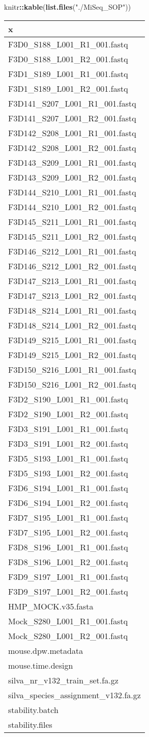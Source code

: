 \documentclass[]{elsarticle} %
\newenvironment{Shaded}{\begin{snugshade}}{\end{snugshade}}
\newcommand{\KeywordTok}[1]{\textcolor[rgb]{0.13,0.29,0.53}{\textbf{#1}}}
\newcommand{\StringTok}[1]{\textcolor[rgb]{0.31,0.60,0.02}{#1}}
\newcommand{\OperatorTok}[1]{\textcolor[rgb]{0.81,0.36,0.00}{\textbf{#1}}}
\newcommand{\NormalTok}[1]{#1}
\begin{document}
\begin{Shaded}
\begin{Highlighting}[]
\NormalTok{knitr}\OperatorTok{::}\KeywordTok{kable}\NormalTok{(}\KeywordTok{list.files}\NormalTok{(}\StringTok{"./MiSeq_SOP"}\NormalTok{))}
\end{Highlighting}
\end{Shaded}

\begin{longtable}[]{@{}l@{}}
\toprule
x\tabularnewline
\midrule
\endhead
F3D0\_S188\_L001\_R1\_001.fastq\tabularnewline
F3D0\_S188\_L001\_R2\_001.fastq\tabularnewline
F3D1\_S189\_L001\_R1\_001.fastq\tabularnewline
F3D1\_S189\_L001\_R2\_001.fastq\tabularnewline
F3D141\_S207\_L001\_R1\_001.fastq\tabularnewline
F3D141\_S207\_L001\_R2\_001.fastq\tabularnewline
F3D142\_S208\_L001\_R1\_001.fastq\tabularnewline
F3D142\_S208\_L001\_R2\_001.fastq\tabularnewline
F3D143\_S209\_L001\_R1\_001.fastq\tabularnewline
F3D143\_S209\_L001\_R2\_001.fastq\tabularnewline
F3D144\_S210\_L001\_R1\_001.fastq\tabularnewline
F3D144\_S210\_L001\_R2\_001.fastq\tabularnewline
F3D145\_S211\_L001\_R1\_001.fastq\tabularnewline
F3D145\_S211\_L001\_R2\_001.fastq\tabularnewline
F3D146\_S212\_L001\_R1\_001.fastq\tabularnewline
F3D146\_S212\_L001\_R2\_001.fastq\tabularnewline
F3D147\_S213\_L001\_R1\_001.fastq\tabularnewline
F3D147\_S213\_L001\_R2\_001.fastq\tabularnewline
F3D148\_S214\_L001\_R1\_001.fastq\tabularnewline
F3D148\_S214\_L001\_R2\_001.fastq\tabularnewline
F3D149\_S215\_L001\_R1\_001.fastq\tabularnewline
F3D149\_S215\_L001\_R2\_001.fastq\tabularnewline
F3D150\_S216\_L001\_R1\_001.fastq\tabularnewline
F3D150\_S216\_L001\_R2\_001.fastq\tabularnewline
F3D2\_S190\_L001\_R1\_001.fastq\tabularnewline
F3D2\_S190\_L001\_R2\_001.fastq\tabularnewline
F3D3\_S191\_L001\_R1\_001.fastq\tabularnewline
F3D3\_S191\_L001\_R2\_001.fastq\tabularnewline
F3D5\_S193\_L001\_R1\_001.fastq\tabularnewline
F3D5\_S193\_L001\_R2\_001.fastq\tabularnewline
F3D6\_S194\_L001\_R1\_001.fastq\tabularnewline
F3D6\_S194\_L001\_R2\_001.fastq\tabularnewline
F3D7\_S195\_L001\_R1\_001.fastq\tabularnewline
F3D7\_S195\_L001\_R2\_001.fastq\tabularnewline
F3D8\_S196\_L001\_R1\_001.fastq\tabularnewline
F3D8\_S196\_L001\_R2\_001.fastq\tabularnewline
F3D9\_S197\_L001\_R1\_001.fastq\tabularnewline
F3D9\_S197\_L001\_R2\_001.fastq\tabularnewline
HMP\_MOCK.v35.fasta\tabularnewline
Mock\_S280\_L001\_R1\_001.fastq\tabularnewline
Mock\_S280\_L001\_R2\_001.fastq\tabularnewline
mouse.dpw.metadata\tabularnewline
mouse.time.design\tabularnewline
silva\_nr\_v132\_train\_set.fa.gz\tabularnewline
silva\_species\_assignment\_v132.fa.gz\tabularnewline
stability.batch\tabularnewline
stability.files\tabularnewline
\bottomrule
\end{longtable}
\end{document}
